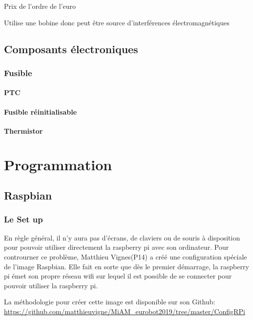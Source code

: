 \documentclass[a4paper, 11pt]{report}
\begin{document}
Prix de l'ordre de l'euro

Utilise une bobine donc peut être source d'interférences électromagnétiques

\chapter{Composants électroniques}

\section{Fusible}

\subsection{PTC}

\subsection{Fusible réinitialisable}

\subsection{Thermistor}

\part{Programmation}

\chapter{Raspbian}

\section{Le Set up}
En règle général, il n'y aura pas d'écrans, de claviers ou de souris à disposition pour pouvoir utiliser directement la raspberry pi avec son ordinateur. Pour controurner ce problème, Matthieu Vignes(P14) a créé une configuration spéciale de l'image Raspbian.  Elle fait en sorte que dès le premier démarrage, la raspberry pi émet son propre réseau wifi sur lequel il est possible de se connecter pour pouvoir utiliser la raspberry pi.

La méthodologie pour créer cette image est disponible sur son Github:
\url{https://github.com/matthieuvigne/MiAM_eurobot2019/tree/master/ConfigRPi}
\end{document}
